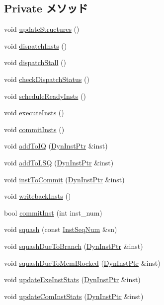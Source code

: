 \subsection*{Private メソッド}
\begin{DoxyCompactItemize}
\item 
void \hyperlink{classBackEnd_a1107d388cfcea92a9043608346ce98f0}{updateStructures} ()
\item 
void \hyperlink{classBackEnd_ac3f94deccc87588d728716efc4dd7ce8}{dispatchInsts} ()
\item 
void \hyperlink{classBackEnd_a3a69629e2b050560eb983bdedffc30ba}{dispatchStall} ()
\item 
void \hyperlink{classBackEnd_aee5c9997a61eb30564062dcdbda8c246}{checkDispatchStatus} ()
\item 
void \hyperlink{classBackEnd_a3694e72427d3a616808797f9343d1fc4}{scheduleReadyInsts} ()
\item 
void \hyperlink{classBackEnd_a2d00e30d66a56e4667e28df302c98ac0}{executeInsts} ()
\item 
void \hyperlink{classBackEnd_ac8b85fbfdf330d000c094a9d1886d264}{commitInsts} ()
\item 
void \hyperlink{classBackEnd_a2c7b6d036b77d997f9c6f718ddf0be7d}{addToIQ} (\hyperlink{classBackEnd_a028ce10889c5f6450239d9e9a7347976}{DynInstPtr} \&inst)
\item 
void \hyperlink{classBackEnd_a1b9c2184abc4f4e7a00285130f39bf26}{addToLSQ} (\hyperlink{classBackEnd_a028ce10889c5f6450239d9e9a7347976}{DynInstPtr} \&inst)
\item 
void \hyperlink{classBackEnd_a720e9865ffa6e84b756f5ec1d1a24d94}{instToCommit} (\hyperlink{classBackEnd_a028ce10889c5f6450239d9e9a7347976}{DynInstPtr} \&inst)
\item 
void \hyperlink{classBackEnd_a5e9a203f943b3a8a243ddc6d2a0a240d}{writebackInsts} ()
\item 
bool \hyperlink{classBackEnd_a300f33ed45badc3c856983b1b7469955}{commitInst} (int inst\_\-num)
\item 
void \hyperlink{classBackEnd_adc9b67ce59b0b2e930cfaf6361ce42c5}{squash} (const \hyperlink{inst__seq_8hh_a258d93d98edaedee089435c19ea2ea2e}{InstSeqNum} \&sn)
\item 
void \hyperlink{classBackEnd_a05c89a1532adb13cc0632fc3bb600add}{squashDueToBranch} (\hyperlink{classBackEnd_a028ce10889c5f6450239d9e9a7347976}{DynInstPtr} \&inst)
\item 
void \hyperlink{classBackEnd_a5fcf443dc6ada1ab1936df923c3205d2}{squashDueToMemBlocked} (\hyperlink{classBackEnd_a028ce10889c5f6450239d9e9a7347976}{DynInstPtr} \&inst)
\item 
void \hyperlink{classBackEnd_a132db67a5c42af856da64e347e8284d8}{updateExeInstStats} (\hyperlink{classBackEnd_a028ce10889c5f6450239d9e9a7347976}{DynInstPtr} \&inst)
\item 
void \hyperlink{classBackEnd_a5bbf266cb0cc97eed138c8fe0d2d76b6}{updateComInstStats} (\hyperlink{classBackEnd_a028ce10889c5f6450239d9e9a7347976}{DynInstPtr} \&inst)
\end{DoxyCompactItemize}
